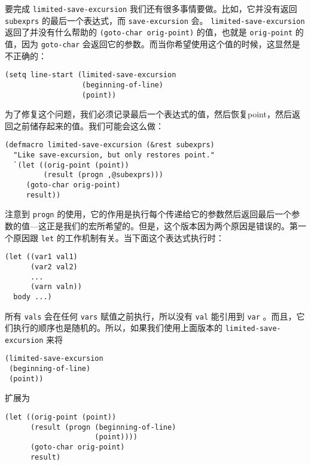 要完成 \texttt{limited-save-excursion} 我们还有很多事情要做。比如，它并没有返回 \texttt{subexprs} 的最后一个表达式，而 \texttt{save-excursion} 会。 \texttt{limited-save-excursion} 返回了并没有什么帮助的 \texttt{(goto-char orig-point)} 的值，也就是 \texttt{orig-point} 的值，因为 \texttt{goto-char} 会返回它的参数。而当你希望使用这个值的时候，这显然是不正确的：

\begin{verbatim}
(setq line-start (limited-save-excursion
                  (beginning-of-line)
                  (point))
\end{verbatim}

为了修复这个问题，我们必须记录最后一个表达式的值，然后恢复point，然后返回之前储存起来的值。我们可能会这么做：

\begin{verbatim}
(defmacro limited-save-excursion (&rest subexprs)
  "Like save-excursion, but only restores point."
  `(let ((orig-point (point))
         (result (progn ,@subexprs)))
     (goto-char orig-point)
     result))
\end{verbatim}

注意到 \texttt{progn} 的使用，它的作用是执行每个传递给它的参数然后返回最后一个参数的值---这正是我们的宏所希望的。但是，这个版本因为两个原因是错误的。第一个原因跟 \texttt{let} 的工作机制有关。当下面这个表达式执行时：

\begin{verbatim}
(let ((var1 val1)
      (var2 val2)
      ...
      (varn valn))
  body ...)
\end{verbatim}

所有 \texttt{vals} 会在任何 \texttt{vars} 赋值之前执行，所以没有 \texttt{val} 能引用到 \texttt{var} 。而且，它们执行的顺序也是随机的。所以，如果我们使用上面版本的 \texttt{limited-save-excursion} 来将

\begin{verbatim}
(limited-save-excursion
 (beginning-of-line)
 (point))
\end{verbatim}

扩展为

\begin{verbatim}
(let ((orig-point (point))
      (result (progn (beginning-of-line)
                     (point))))
      (goto-char orig-point)
      result)
\end{verbatim}

